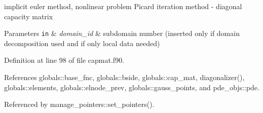 implicit euler method, nonlinear problem Picard iteration method -\/ diagonal capacity matrix 


\begin{DoxyParams}[1]{Parameters}
\mbox{\tt in}  & {\em domain\+\_\+id} & subdomain number (inserted only if domain decomposition used and if only local data needed) \\
\hline
\end{DoxyParams}


Definition at line 98 of file capmat.\+f90.



References globals\+::base\+\_\+fnc, globals\+::bside, globals\+::cap\+\_\+mat, diagonalizer(), globals\+::elements, globals\+::elnode\+\_\+prev, globals\+::gauss\+\_\+points, and pde\+\_\+objs\+::pde.



Referenced by manage\+\_\+pointers\+::set\+\_\+pointers().


